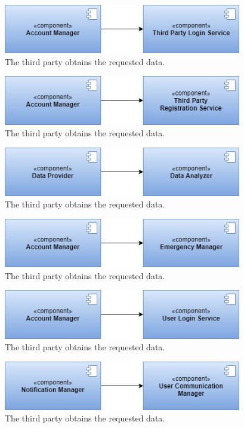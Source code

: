 \begin{figure}
    \centering
    \includegraphics[width=295pt]{images/IntegrationSequence/TrackMe-Integration_sequence16.jpg}
    \caption{The third party obtains the requested data.}
\end{figure}
\begin{figure}
    \centering
    \includegraphics[width=295pt]{images/IntegrationSequence/TrackMe-Integration_sequence17.jpg}
    \caption{The third party obtains the requested data.}
\end{figure}
\begin{figure}
    \centering
    \includegraphics[width=295pt]{images/IntegrationSequence/TrackMe-Integration_sequence18.jpg}
    \caption{The third party obtains the requested data.}
\end{figure}
\begin{figure}
    \centering
    \includegraphics[width=295pt]{images/IntegrationSequence/TrackMe-Integration_sequence19.jpg}
    \caption{The third party obtains the requested data.}
\end{figure}
\begin{figure}
    \centering
    \includegraphics[width=295pt]{images/IntegrationSequence/TrackMe-Integration_sequence20.jpg}
    \caption{The third party obtains the requested data.}
\end{figure}
\begin{figure}
    \centering
    \includegraphics[width=295pt]{images/IntegrationSequence/TrackMe-Integration_sequence21.jpg}
    \caption{The third party obtains the requested data.}
\end{figure}
\clearpage
